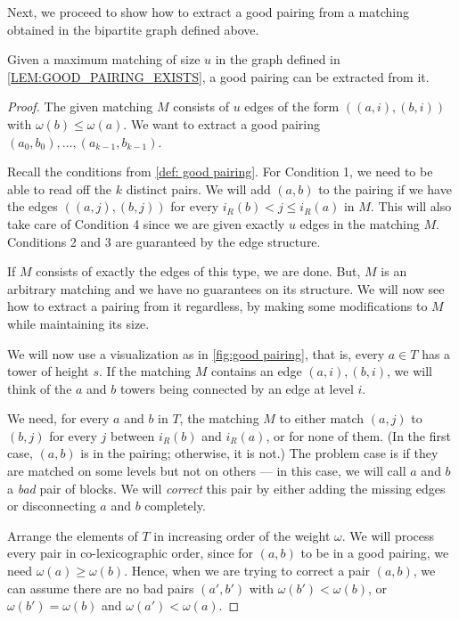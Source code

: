 \documentclass{theoretics}
\begin{document}
	Next, we proceed to show how to extract a good pairing from a matching obtained in the bipartite graph defined above.
	
	\begin{claim} \label{clm: matching to good pairing}
		Given a maximum matching of size $u$ in the graph defined in \cref{LEM:GOOD_PAIRING_EXISTS}, a good pairing can be extracted from it. 
	\end{claim}
	
	\begin{proof}
		The given matching $M$ consists of $u$ edges of the form $((a, i), (b, i))$ with $\omega(b) \leq \omega(a)$. We want to extract a good pairing $(a_0, b_0), \dotsc, (a_{k-1}, b_{k-1})$.
		
		Recall the conditions from \cref{def: good pairing}. For Condition 1, we need to be able to read off the $k$ distinct pairs. We will add $(a, b)$ to the pairing if we have the edges $((a, j), (b, j))$ for every $i_R(b) < j \leq i_R(a)$ in $M$. This will also take care of Condition 4 since we are given exactly $u$ edges in the matching $M$. Conditions 2 and 3 are guaranteed by the edge structure.
		
		If $M$ consists of exactly the edges of this type, we are done. But, $M$ is an arbitrary matching and we have no guarantees on its structure. We will now see how to extract a pairing from it regardless, by making some modifications to $M$ while maintaining its size.
		
		We will now use a visualization as in \cref{fig:good pairing}, that is, every $a \in T$ has a tower of height $s$. If the matching $M$ contains an edge $(a, i), (b, i)$, we will think of the $a$ and $b$ towers being connected by an edge at level $i$.  
		
		We need, for every $a$ and $b$ in $T$, the matching $M$ to either match $(a, j)$ to $(b, j)$ for every $j$ between $i_R(b)$ and $i_R(a)$, or for none of them. (In the first case, $(a, b)$ is in the pairing; otherwise, it is not.)  The problem case is if they are matched on some levels but not on others --- in this case, we will call $a$ and $b$ a \emph{bad} pair of blocks. We will \emph{correct} this pair by either adding the missing edges or disconnecting $a$ and $b$ completely.
		
		Arrange the elements of $T$ in increasing order of the weight $\omega$. We will process every pair in co-lexicographic order, since for $(a, b)$ to be in a good pairing, we need $\omega(a) \geq \omega(b)$. Hence, when we are trying to correct a pair $(a, b)$, we can assume there are no bad pairs $(a', b')$ with $\omega(b') < \omega(b)$, or $\omega(b') = \omega(b)$ and $\omega(a') < \omega(a)$.
		

\end{proof}
\end{document}
